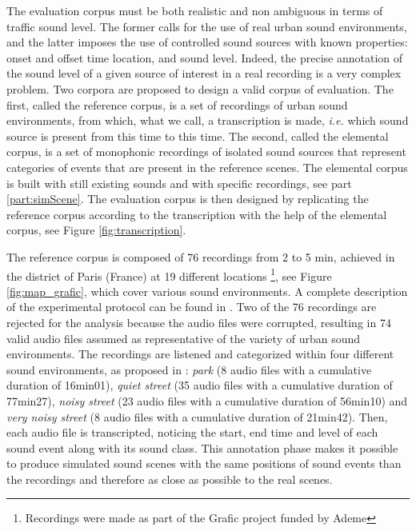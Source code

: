 \documentclass[review,5p,twocolumn,sort&compress,times]{elsarticle}
\begin{document}
The evaluation corpus must be both realistic and non ambiguous in terms of traffic sound level. The former calls for the use of real urban sound environments, and the latter imposes the use of controlled sound sources with known properties: onset and offset time location, and sound level. Indeed, the precise annotation of the sound level of a given source of interest in a real recording is a very complex problem. Two corpora are proposed to design a valid corpus of  evaluation. The first, called the reference corpus, is a set of recordings of urban sound environments, from which, what we call, a transcription is made, \textit{i.e.} which sound source is present from this time to this time. The second, called the elemental corpus, is a set of monophonic recordings of isolated sound sources that represent categories of events that are present in the reference scenes. The elemental corpus is built with still existing sounds and with specific recordings, see part \ref{part:simScene}. The evaluation corpus is then designed by replicating the reference corpus according to the transcription with the help of the elemental corpus, see Figure \ref{fig:transcription}.

The reference corpus is composed of 76 recordings from 2 to 5 min, achieved in the  district of Paris (France) at 19 different locations \footnote{Recordings were made as part of the Grafic project funded by Ademe}, see Figure \ref{fig:map_grafic}, which cover various sound environments. A complete description of the experimental protocol can be found in \cite{aumond_modelling_2017}. Two of the 76 recordings are rejected for the analysis because the audio files were corrupted, resulting in 74 valid audio files assumed as representative of the variety of urban sound environments. The recordings are listened and categorized within four different sound environments, as proposed in \cite{can_describing_2015}: \textit{park} (8 audio files with a cumulative duration of 16min01), \textit{quiet street} (35 audio files with a cumulative duration of 77min27), \textit{noisy street} (23 audio files with a cumulative duration of 56min10) and \textit{very noisy street} (8 audio files with a cumulative duration of 21min42). Then, each audio file is transcripted, noticing the start, end time and level of each sound event along with its sound class. This annotation phase makes it possible to produce simulated sound scenes with the same positions of sound events than the recordings and therefore as close as possible to the real scenes.
\end{document}
